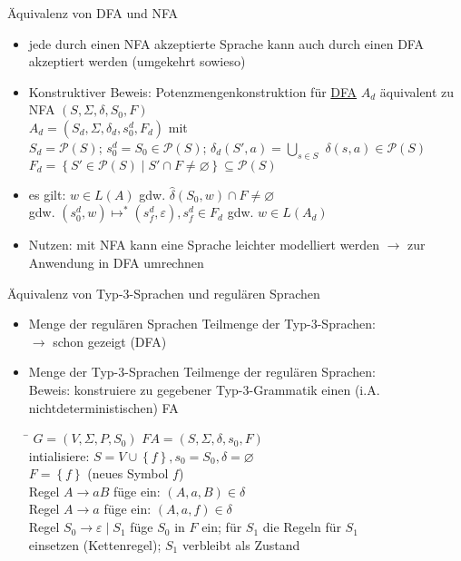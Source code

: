 \begin{frame}{Äquivalenz von DFA und NFA}
	\begin{itemize}
		\item jede durch einen NFA akzeptierte Sprache kann auch durch einen DFA akzeptiert werden (umgekehrt sowieso)
		\item Konstruktiver Beweis: Potenzmengenkonstruktion für \underline{DFA} $A_d$ äquivalent zu NFA $(S, \Sigma, \delta, S_0, F)$\\
		$A_d=\left(S_d, \Sigma, \delta_d, s_0^d, F_d\right)$ mit\\
		\quad $S_d=\mathcal{P}(S)$; 
		\quad $s_0^d=S_0 \in \mathcal{P}(S)$;
		\quad $\delta_d(S', a)=\bigcup_{s \in S}$
		\quad $\delta(s, a) \in \mathcal{P}(S)$\\
		\quad $F_d = \left\{S' \in \mathcal{P}(S) \mid S' \cap F \neq \varnothing\right\} \subseteq \mathcal{P}(S)$
		\item es gilt: $w \in L(A)$ gdw. $\hat{\delta}(S_0, w) \cap F \neq \varnothing$\\
		\quad gdw. $(s_0^d, w) \mapsto^* (s_f^d, \varepsilon), s_f^d \in F_d$ gdw. $w \in L(A_d)$
		\item Nutzen: mit NFA kann eine Sprache leichter modelliert werden $\rightarrow$ zur Anwendung in DFA umrechnen
	\end{itemize}
\end{frame}

\begin{frame}{Äquivalenz von Typ-3-Sprachen und regulären Sprachen}
	\begin{itemize}
		\item Menge der regulären Sprachen Teilmenge der Typ-3-Sprachen:\\
		\quad $\rightarrow$ schon gezeigt (DFA)
		\item Menge der Typ-3-Sprachen Teilmenge der regulären Sprachen:\\
		Beweis: konstruiere zu gegebener Typ-3-Grammatik einen (i.A. nichtdeterministischen) FA\\
		\begin{tabbing}
			\hspace{5cm}\=\kill
		$G=(V,\Sigma, P, S_0)$	\> $FA=(S, \Sigma, \delta, s_0, F)$\\ 
			\> intialisiere: $S=V \cup \left\{f\right\}, s_0=S_0, \delta=\varnothing$\\ 
			\> $F=\left\{f\right\}$ (neues Symbol $f$)\\ 
		Regel $A \rightarrow aB$	\> füge ein: $(A, a, B) \in \delta$\\ 
		Regel $A \rightarrow a$	\> füge ein: $(A, a, f) \in \delta$\\ 
		Regel $S_0 \rightarrow \varepsilon \mid S_1$	\> füge $S_0$ in $F$ ein; für $S_1$ die Regeln für $S_1$\\ 
			\> einsetzen (Kettenregel); $S_1$ verbleibt als Zustand
		\end{tabbing} 
	\end{itemize}
\end{frame}

